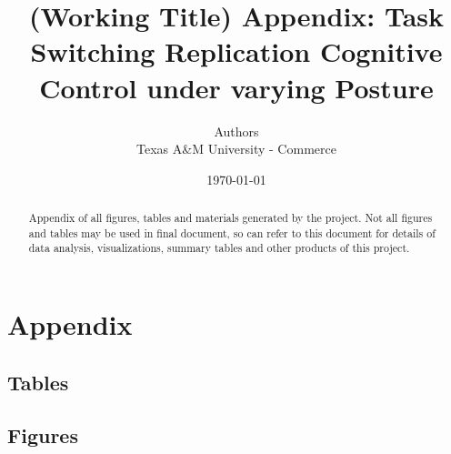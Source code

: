 \documentclass[
  letterpaper, 12pt, onecolumn, oneside, notitlepage]{article}
\title{(Working Title) Appendix: Task Switching Replication Cognitive
Control under varying Posture}
\author{Authors\\
Texas A\&M University - Commerce}
\date{\today}
\begin{document}
\maketitle
\begin{abstract}
Appendix of all figures, tables and materials generated by the project.
Not all figures and tables may be used in final document, so can refer
to this document for details of data analysis, visualizations, summary
tables and other products of this project.
\end{abstract}

\hypertarget{appendix}{%
\section*{Appendix}\label{appendix}}

\hypertarget{tables}{%
\subsection*{Tables}\label{tables}}



\hypertarget{figures}{%
\subsection*{Figures}\label{figures}}

\printbibliography[heading=bibintoc]
\end{document}
